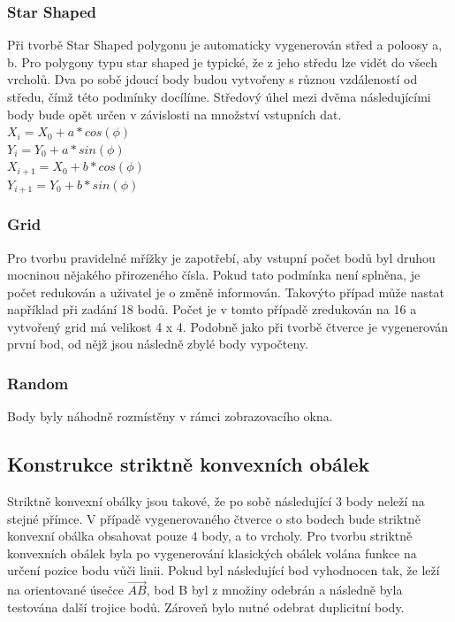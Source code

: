 \documentclass[a4paper, 12pt]{article}
\begin{document}
\subsubsection{Star Shaped}
Při tvorbě Star Shaped polygonu je automaticky vygenerován střed a poloosy a, b. Pro polygony typu star shaped je typické, že z jeho středu lze vidět do všech vrcholů. Dva po sobě jdoucí body budou vytvořeny s různou vzdáleností od středu, čímž této podmínky docílíme. Středový úhel mezi dvěma následujícími body bude opět určen v závislosti na množství vstupních dat.\\
$ X_i = X_0 + a * cos(\phi)$ \\
$ Y_i = Y_0 + a * sin(\phi) $ \\
$ X_{i+1} = X_0 + b * cos(\phi)$ \\
$ Y_{i+1} = Y_0 + b * sin(\phi) $

\subsubsection{Grid}
Pro tvorbu pravidelné mřížky je zapotřebí, aby vstupní počet bodů byl druhou mocninou nějakého přirozeného čísla. Pokud tato podmínka není splněna, je počet redukován a uživatel je o změně informován. Takovýto případ může nastat například při zadání 18 bodů. Počet je v tomto případě zredukován na 16 a vytvořený grid má velikost 4 x 4. Podobně jako při tvorbě čtverce je vygenerován první bod, od nějž jsou následně zbylé body vypočteny.

\subsubsection{Random}
Body byly náhodně rozmístěny v rámci zobrazovacího okna.

\subsection{Konstrukce striktně konvexních obálek}
Striktně konvexní obálky jsou takové, že po sobě následující 3 body neleží na stejné přímce. V případě vygenerovaného čtverce o sto bodech bude striktně konvexní obálka obsahovat pouze 4 body, a to vrcholy. Pro tvorbu striktně konvexních obálek byla po vygenerování klasických obálek volána funkce na určení pozice bodu vůči linii. Pokud byl následující bod vyhodnocen tak, že leží na orientované úsečce $\overrightarrow{AB}$, bod B byl z množiny odebrán a následně byla testována další trojice bodů. Zároveň bylo nutné odebrat duplicitní body.
\end{document}
